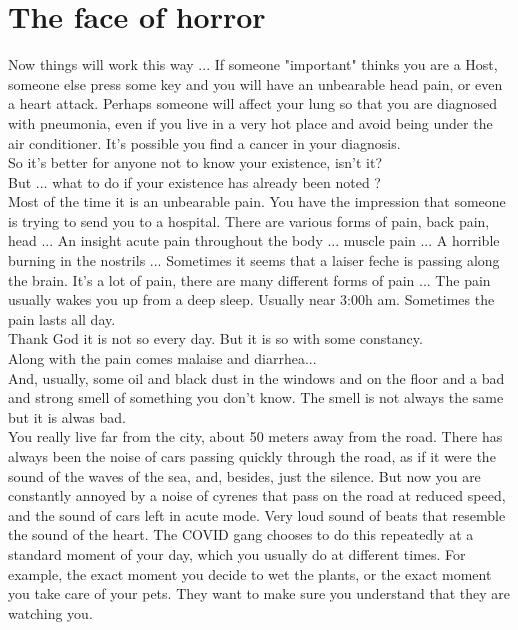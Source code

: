 \documentclass[11pt]{book}
\begin{document}
\chapter{The face of horror}

\noindent Now things will work this way ... If someone "important" thinks you are a Host, someone else press some key and you will have an unbearable head pain, or even a heart attack. Perhaps someone will affect your lung so that you are diagnosed with pneumonia, even if you live in a very hot place and avoid being under the air conditioner. It's possible you find a cancer in your diagnosis. \\

\noindent So it's better for anyone not to know your existence, isn't it? \\

\noindent But ... what to do if your existence has already been noted ? \\

\noindent Most of the time it is an unbearable pain. You have the impression that someone is trying to send you to a hospital. There are various forms of pain, back pain, head ... An insight acute pain throughout the body ... muscle pain ... A horrible burning in the nostrils ... Sometimes it seems that a laiser feche is passing along the brain. It's a lot of pain, there are many different forms of pain ... The pain usually wakes you up from a deep sleep. Usually near 3:00h am. Sometimes the pain lasts all day. \\

\noindent Thank God it is not so every day. But it is so with some constancy. \\

\noindent Along with the pain comes malaise and diarrhea... \\

\noindent And, usually, some oil and black dust in the windows and on the floor and a bad and strong smell of something you don't know. The smell is not always the same but it is alwas bad. \\

\noindent You really live far from the city, about 50 meters away from the road. There has always been the noise of cars passing quickly through the road, as if it were the sound of the waves of the sea, and, besides, just the silence. But now you are constantly annoyed by a noise of cyrenes that pass on the road at reduced speed, and the sound of cars left in acute mode. Very loud sound of beats that resemble the sound of the heart. The COVID gang chooses to do this repeatedly at a standard moment of your day, which you usually do at different times. For example, the exact moment you decide to wet the plants, or the exact moment you take care of your pets. They want to make sure you understand that they are watching you. \\
\end{document}
